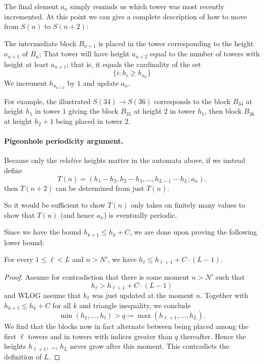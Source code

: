 \documentclass[11pt]{scrartcl}
\begin{document}
The final element $a_n$ simply reminds us which tower was most recently incremented.
At this point we can give a complete description of how to move from $S(n)$ to $S(n+2)$:
\begin{itemize}
  \ii The intermediate block $B_{n+1}$ is placed in the tower
  corresponding to the height $a_{n+1}$ of $B_n$;
  \ii That tower will have height $a_{n+2}$ equal to the number of towers
  with height at least $a_{n+1}$; that is, it equals the cardinality of the set
  \[ \{ i \colon h_i \ge h_{a_n} \} \]
  \ii We increment $h_{a_{n+2}}$ by $1$ and update $a_n$.
\end{itemize}

For example, the illustrated $S(34) \to S(36)$
corresponds to the block $B_{34}$ at height $h_1$ in tower $1$
giving the block $B_{35}$ at height $2$ in tower $h_1$,
then block $B_{36}$ at height $h_2 + 1$ being placed in tower $2$.


\paragraph{Pigeonhole periodicity argument.}
Because only the \emph{relative} heights matter in the automata above,
if we instead define
\[ T(n) = (h_1-h_2, h_2-h_3, \dots, h_{L-1}-h_L; a_n). \]
then $T(n+2)$ can be determined from just $T(n)$.

So it would be sufficient to show $T(n)$ only takes on finitely many values
to show that $T(n)$ (and hence $a_n$) is eventually periodic.

Since we have the bound $h_{k+1} \le h_k + C$,
we are done upon proving the following lower bound:
\begin{claim*}
  For every $1 \le \ell < L$ and $n > N'$,
  we have $h_\ell \le h_{\ell+1} + C \cdot (L-1)$.
\end{claim*}
\begin{proof}
  Assume for contradiction that there is some moment $n > N'$ such that
  \[ h_\ell > h_{\ell+1} + C \cdot (L-1) \]
  and WLOG assume that $h_\ell$ was just updated at the moment $n$.
  Together with $h_{k+1} \le h_k + C$ for all $k$ and triangle inequality, we conclude
  \[ \min(h_1, \dots, h_\ell) > q \coloneq \max(h_{\ell+1}, \dots, h_L). \]
  We find that the blocks now in fact alternate between being placed
  among the first $\ell$ towers and in towers with indices greater than $q$ thereafter.
  Hence the heights $h_{\ell+1}$, \dots, $h_L$ never grow after this moment.
  This contradicts the definition of $L$.
\end{proof}
\end{document}

